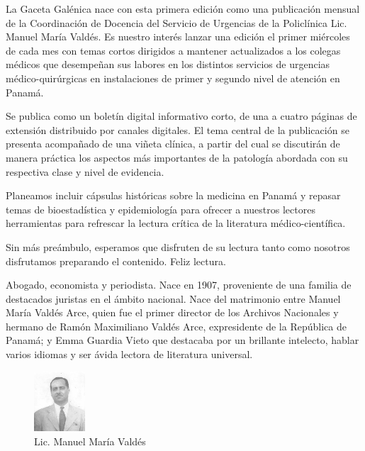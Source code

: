 \documentclass[a4paper]{article}
\date{\today}
\let\cite=\supercite
\begin{document}
\maketitle

\begin{multicols}{3}



La Gaceta Galénica nace con esta primera edición como una publicación mensual de
la Coordinación de Docencia del Servicio de Urgencias de la Policlínica Lic.
Manuel María Valdés. Es nuestro interés lanzar una edición el primer miércoles
de cada mes con temas cortos dirigidos a mantener actualizados a los colegas
médicos que desempeñan sus labores en los distintos servicios de urgencias
médico-quirúrgicas en instalaciones de primer y segundo nivel de atención en
Panamá.

Se publica como un boletín digital informativo corto, de una a cuatro páginas de
extensión distribuido por canales digitales. El tema central de la publicación
se presenta acompañado de una viñeta clínica, a partir del cual se discutirán
de manera práctica los aspectos más importantes de la patología abordada con su
respectiva clase y nivel de evidencia.

Planeamos incluir cápsulas históricas sobre la medicina en Panamá y repasar
temas de bioestadística y epidemiología para ofrecer a nuestros lectores
herramientas para refrescar la lectura crítica de la literatura
médico-científica.

Sin más preámbulo, esperamos que disfruten de su lectura tanto como nosotros
disfrutamos preparando el contenido. Feliz lectura.

\closearticle



Abogado, economista y periodista. Nace en 1907, proveniente de una familia de
destacados juristas en el ámbito nacional. Nace del matrimonio entre Manuel
María Valdés Arce, quien fue el primer director de los Archivos Nacionales y
hermano de Ramón Maximiliano Valdés Arce, expresidente de la República de
Panamá; y Emma Guardia Vieto que destacaba por un brillante intelecto, hablar
varios idiomas y ser ávida lectora de literatura universal\cite{panamerica10}.

\begin{figure}
	\begin{center}
		\vspace{-10pt}
		\includegraphics[width=0.17\textwidth]{mmvaldes.jpg}
	\end{center}
	\caption*{Lic. Manuel María Valdés}
\end{figure}


\end{multicols}
\end{document}
